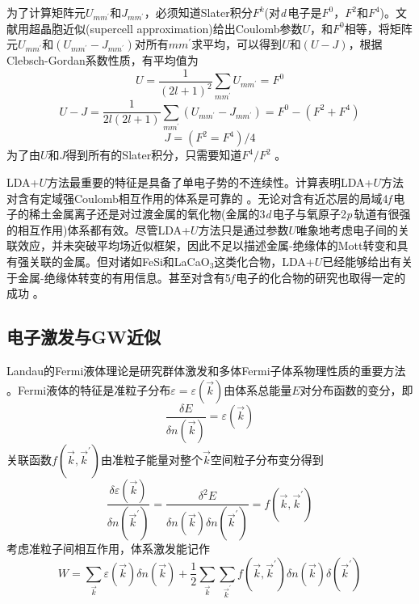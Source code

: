 {为了计算矩阵元$U_{mm^{\prime}}$和$J_{mm^{\prime}}$，必须知道Slater积分$F^k$(对{\it d}\,电子是$F^0$，$F^2$和$F^4$)。文献\cite{PRB43-7570_1991}用超晶胞近似(supercell approximation)给出Coulomb参数$U$，和$F^0$相等，将矩阵元$U_{mm^{\prime}}$和$(U_{mm^{\prime}}-J_{mm^{\prime}})$对所有$mm^{\prime}$求平均，可以得到$U$和$(U-J)$，根据Clebsch-Gordan系数性质，有平均值为
\begin{equation}
  U=\frac1{(2l+1)^2}\sum_{mm^{\prime}}U_{mm^{\prime}}=F^0
  \label{eq:solid-216}
\end{equation}
\begin{equation}
  U-J=\frac1{2l(2l+1)}\sum_{mm^{\prime}}(U_{mm^{\prime}}-J_{mm^{\prime}})=F^0-(F^2+F^4)
  \label{eq:solid-217}
\end{equation}
\begin{equation}
  J=(F^2=F^4)/4
  \label{eq:solid-218}
\end{equation}
为了由$U$和$J$得到所有的Slater积分，只需要知道$F^4/F^2$%
。

LDA+$U$方法最重要的特征是具备了单电子势的不连续性。计算表明LDA+$U$方法对含有定域强Coulomb相互作用的体系是可靠的%
。无论对含有近芯层的局域4{\textit f}\,电子的稀土金属离子还是对过渡金属的氧化物(金属的3{\textit d}\,电子与氧原子2{\textit p}\,轨道有很强的相互作用)体系都有效。尽管LDA+$U$方法只是通过参数$U$唯象地考虑电子间的关联效应，并未突破平均场近似框架，因此不足以描述金属-绝缘体的\textrm{Mott}转变和具有强关联的金属。但对诸如FeSi和LaCaO$_3$这类化合物，LDA+$U$已经能够给出有关于金属-绝缘体转变的有用信息\cite{JPCM9-767_1997}。甚至对含有5{\textit f}\,电子的化合物的研究也取得一定的成功%
。

\subsection{电子激发与GW近似}
Landau的Fermi液体理论是研究群体激发和多体Fermi子体系物理性质的重要方法%
。Fermi液体的特征是准粒子分布$\varepsilon=\varepsilon(\vec k)$由体系总能量$E$对分布函数的变分，即
\begin{equation}
  \frac{\delta E}{\delta n(\vec k)}=\varepsilon(\vec k)
  \label{eq:solid-219}
\end{equation}
关联函数$f(\vec k,\vec k^{\prime})$由准粒子能量对整个$\vec k$空间粒子分布变分得到
\begin{equation}
  \frac{\delta\varepsilon(\vec k)}{\delta n(\vec k^{\prime})}=\frac{\delta^2E}{\delta n(\vec k)\delta n(\vec k^{\prime})}=f(\vec k,\vec k^{\prime})
  \label{eq:solid-220}
\end{equation}
考虑准粒子间相互作用，体系激发能记作
\begin{equation}
  W=\sum_{\vec k}\varepsilon(\vec k)\delta n(\vec k)+\frac12\sum_{\vec k}\sum_{\vec k^{\prime}}f(\vec k,\vec k^{\prime})\delta n(\vec k)\delta(\vec k^{\prime})
  \label{eq:solid-221}
\end{equation}

}
